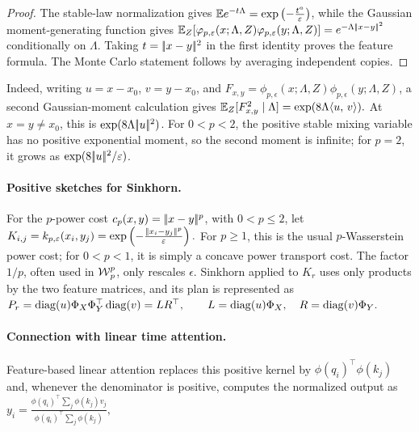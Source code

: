 \begin{proof}
The stable-law normalization gives
$\mathbb{E} e^{-t\Lambda} = \exp\left( -\frac{t^a}{\varepsilon} \right)$,
while the Gaussian moment-generating function gives \(\mathbb{E}_Z[\varphi_{p,\varepsilon}(x;\Lambda,Z)\varphi_{p,\varepsilon}(y;\Lambda,Z)]=e^{-\Lambda|\!| x-y |\!|^2}\) conditionally on \(\Lambda\).
Taking \(t=|\!| x-y |\!|^2\) in the first identity proves the feature formula. The Monte Carlo statement follows by averaging independent copies.
\end{proof}
Indeed, writing $u=x-x_0$, $v=y-x_0$, and $F_{x,y}=\phi_{p,\epsilon}(x;\Lambda,Z)\phi_{p,\epsilon}(y;\Lambda,Z)$, a second Gaussian-moment calculation gives \(\mathbb{E}_Z[F_{x,y}^2\mid\Lambda] = \exp(8\Lambda\langle u,\,v\rangle).\)
At $x=y\neq x_0$, this is $\exp(8\Lambda|\!| u |\!|^2)$. For $0<p<2$, the positive stable mixing variable has no positive exponential moment, so the second moment is infinite; for $p=2$, it grows as $\exp(8|\!| u |\!|^2/\varepsilon)$.

\paragraph{Positive sketches for Sinkhorn.}
For the \(p\)-power cost \(c_p(x,y)=|\!| x-y |\!|^p\), with \(0<p\leq2\), let
\(K_{i,j}=k_{p,\varepsilon}(x_i,y_j) =\exp\left( -\frac{|\!| x_i-y_j |\!|^p}{\varepsilon} \right).\)
For \(p\geq1\), this is the usual \(p\)-Wasserstein power cost; for \(0<p<1\), it is simply a concave power transport cost. The factor \(1/p\), often used in \(\operatorname{\mathcal{W}}_p^p\), only rescales \(\epsilon\). Sinkhorn applied to \(K_r\) uses only products by the two feature matrices, and its plan is represented as
\(P_r = \operatorname{diag}(u)\Phi_X\Phi_Y^\top\operatorname{diag}(v) = LR^\top, \qquad L=\operatorname{diag}(u)\Phi_X, \quad R=\operatorname{diag}(v)\Phi_Y.\)
\paragraph{Connection with linear time attention.}
Feature-based linear attention replaces this positive kernel by \(\phi(q_i)^\top\phi(k_j)\) and, whenever the denominator is positive, computes the normalized output as
\(y_i = \frac{\phi(q_i)^\top\sum_j\phi(k_j)v_j} {\phi(q_i)^\top\sum_j\phi(k_j)},\)
